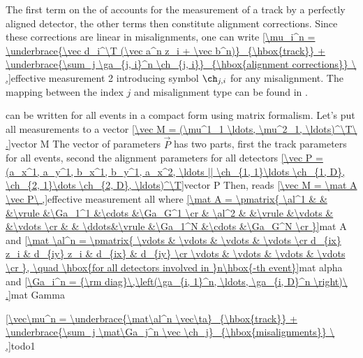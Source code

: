 The first term on the \rhs{} of  accounts for the measurement of a track by a perfectly aligned detector, the other terms then constitute alignment corrections. Since these corrections are linear in misalignments, one can write
\eqref{\mu_i^n =
\underbrace{\vec d_i^\T (\vec a^n z_i + \vec b^n)}_{\hbox{track}}
+
\underbrace{\sum_j \ga_{j, i}^n \ch_{j, i}}_{\hbox{alignment corrections}}
\ ,}{effective measurement 2}
introducing symbol $\ch_{j, i}$ for any misalignment. The mapping between the index $j$ and misalignment type can be found in .


 can be written for all events in a compact form using matrix formalism. Let's put all measurements to a vector
\eqref{\vec M = (\mu^1_1 \ldots, \mu^2_1, \ldots)^\T\ .}{vector M}
The vector of parameters $\vec P$ has two parts, first the track parameters for all events, second the alignment parameters for all detectors
\eqref{\vec P = (a_x^1, a_y^1, b_x^1, b_y^1, a_x^2, \ldots || \ch_{1, 1}\ldots \ch_{1, D}, \ch_{2, 1}\dots \ch_{2, D}, \ldots)^\T}{vector P}
Then,  reads
\eqref{\vec M = \mat A \vec P\ ,}{effective measurement all}
where
\eqref{\mat A = \pmatrix{
\al^1 & 		&		&\vrule	&\Ga_1^1	&\cdots	&\Ga_G^1	\cr
	& \al^2	&		&\vrule	&\vdots		&		&\vdots		\cr
	&		& \ddots&\vrule	&\Ga_1^N	&\cdots	&\Ga_G^N	\cr
}}{mat A}
and
\eqref{\mat \al^n = \pmatrix{
\vdots & \vdots & \vdots & \vdots \cr
d_{ix} z_i & d_{iy} z_i & d_{ix} & d_{iy} \cr
\vdots & \vdots & \vdots & \vdots \cr
}, \quad \hbox{for all detectors involved in }n\hbox{-th event}}{mat alpha}
and
\eqref{\Ga_i^n = {\rm diag}\,\left(\ga_{i, 1}^n, \ldots, \ga_{i, D}^n \right)\ .}{mat Gamma}


\eqref{\vec\mu^n =
\underbrace{\mat\al^n \vec\ta}_{\hbox{track}}
+
\underbrace{\sum_j \mat\Ga_j^n \vec \ch_j}_{\hbox{misalignments}}
\ ,}{todo1}

